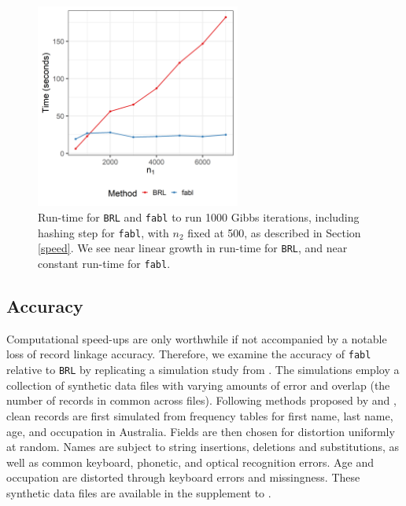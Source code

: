 \documentclass[ba]{imsart}
\begin{document}
	\begin{figure}[h!]
		\begin{center} \includegraphics[width=0.6\textwidth]{../notes/figures/speed_plot_fixed_nB_slides} 
			\caption{Run-time for \texttt{BRL} and \texttt{fabl} to run 1000 Gibbs iterations, including hashing step for \texttt{fabl}, with $n_2$ fixed at 500, as described in Section \ref{speed}. We see near linear growth in run-time for \texttt{BRL}, and near constant run-time for \texttt{fabl}.}\label{fig:speed2}
		\end{center}
	\end{figure}
	
	
	\hypertarget{accuracy}{%
		\subsection{Accuracy}\label{accuracy}}
	
	Computational speed-ups are only worthwhile if not accompanied by a notable loss of record linkage accuracy. Therefore, we examine the accuracy of \texttt{fabl} relative to \texttt{BRL} by replicating a simulation study from \cite{sadinle_bayesian_2017}. The simulations employ a collection of synthetic data files with varying amounts of error and overlap (the number of records in common across files). Following methods proposed by \cite{christen_pudjijono2009} and \cite{christen_vatsalan2013}, clean records are first simulated from frequency tables for first name, last name, age, and occupation in Australia. Fields are then chosen for distortion uniformly at random. Names are subject to string insertions, deletions and substitutions, as well as common keyboard, phonetic, and optical recognition errors. Age and occupation are distorted through keyboard errors and missingness. These synthetic data files are available in the supplement to \cite{sadinle_bayesian_2017}.
	
\end{document}
